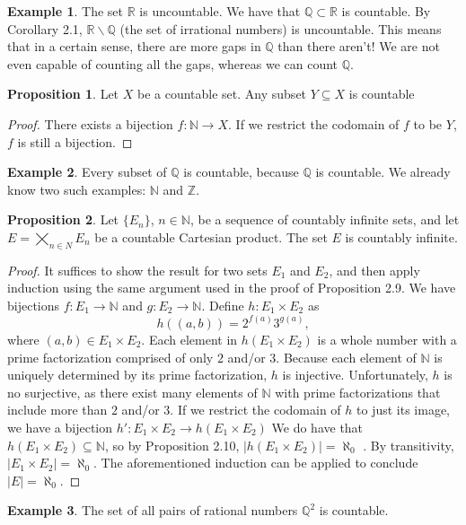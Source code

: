 \documentclass{article}
\newcommand{\N}{\mathbb{N}}
\newcommand{\R}{\mathbb{R}}
\newcommand{\Q}{\mathbb{Q}}
\newcommand{\Z}{\mathbb{Z}}
\theoremstyle{definition}
\newtheorem{proposition}{Proposition}[section]
\newtheorem{example}{Example}[section]
\begin{document}
\begin{example}
	The set $ \R $ is uncountable. We have that $ \Q\subset \R $ is countable. By Corollary 2.1, $ \R\backslash \Q $ (the set of irrational numbers) is uncountable. This means that in a certain sense, there are more gaps in $ \Q $ than there aren't! We are not even capable of counting all the gaps, whereas we can count $ \Q $. 
\end{example}
\begin{proposition}
	Let $ X $ be a countable set. Any subset $ Y\subseteq X $ is countable
\end{proposition}
\begin{proof}
	There exists a bijection $ f:\N\to X $. If we restrict the codomain of $ f $ to be $ Y $, $ f $ is still a bijection. 
\end{proof}
\begin{example}
	Every subset of $ \Q $ is countable, because $ \Q $ is countable. We already know two such examples: $ \N $ and $ \Z $. 
\end{example}
\begin{proposition}
	Let $ \{E_n\} $, $ n\in\N $, be a sequence of countably infinite sets, and let $ E=\bigtimes\limits_{n\in N}E_n $ be a countable Cartesian product. The set $ E $ is countably infinite. 
\end{proposition}
\begin{proof}
	It suffices to show the result for two sets $ E_1 $ and $ E_2 $, and then apply induction using the same argument used in the proof of Proposition 2.9. We have bijections $ f:E_1\to\N$ and $ g:E_2\to\N $. Define $ h:E_1\times E_2 $ as $$ h((a,b))=2^{f(a)}3^{g(a)},$$ where $ (a,b)\in E_1\times E_2 $. Each element in $ h(E_1\times E_2) $ is a whole number with a prime factorization comprised of only $ 2 $ and/or $ 3 $. Because each element of $ \N $ is uniquely determined by its prime factorization, $ h $ is injective. Unfortunately, $ h $ is no surjective, as there exist many elements of $ \N $ with prime factorizations that include more than $ 2 $ and/or $ 3 $. If we restrict the codomain of $ h $ to just its image, we have a bijection $ h':E_1\times E_2\to  h(E_1\times E_2) $  We do have that $ h(E_1\times E_2)\subseteq \N  $, so by Proposition 2.10, $ |h(E_1\times E_2)|=\aleph_0 $ . By transitivity, $ |E_1\times E_2|=\aleph_0 $. The aforementioned induction can be applied to conclude $ |E|=\aleph_0 $. 
\end{proof}
\begin{example}
	The set of all pairs of rational numbers $ \Q^2 $ is countable.
\end{example}
\end{document}
